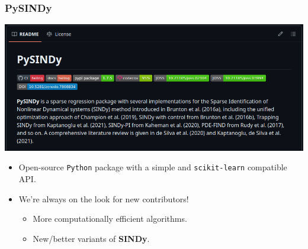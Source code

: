 \documentclass[aspectratio=169,compress,12pt,dvipsnames]{beamer}
\begin{document}
\begin{frame}
    \frametitle{PySINDy}
    \vfill
    \begin{minipage}{.38\textwidth}
        \centering
        \vspace{-2em}
        \includegraphics[width=\textwidth]{imgs/pysindy.png}
    \end{minipage}%
    \hfill
    \begin{minipage}{.58\textwidth}
        \begin{itemize}
            \item Open-source \texttt{Python} package with a simple and \texttt{scikit-learn} compatible API.
            \par\bigskip
            \item We're always on the look for new contributors!
            \begin{itemize}
                \item More computationally efficient algorithms.
                \item New/better variants of \textbf{SINDy}.
            \end{itemize}
        \end{itemize}
    \end{minipage}
    \vfill
\end{frame}
\end{document}
